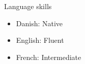 \documentclass{resume} %
\begin{document}
\begin{rSection}{Language skills}
\begin{itemize}
\item Danish: Native
\item English: Fluent
\item French: Intermediate
\end{itemize}
\end{rSection}




\end{document}
